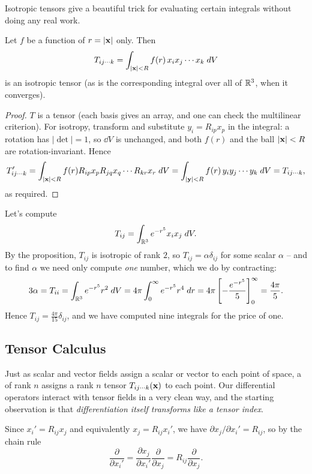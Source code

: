 \documentclass[a4paper]{scrartcl}
\begin{document}
Isotropic tensors give a beautiful trick for evaluating certain integrals without doing any real work.

\begin{proposition}
	Let $f$ be a function of $r = |\mathbf{x}|$ only. Then
	$$
	T_{ij \cdots k} = \int_{|\mathbf{x}| < R} f(r) \, x_i x_j \cdots x_k \; d V
	$$
	is an isotropic tensor (as is the corresponding integral over all of $\mathbb{R}^3$, when it converges).
\end{proposition}
\begin{proof}
	$T$ is a tensor (each basis gives an array, and one can check the multilinear criterion). For isotropy, transform and substitute $y_i = R_{ip}x_p$ in the integral: a rotation has $|\det| = 1$, so $\dd V$ is unchanged, and both $f(r)$ and the ball $|\mathbf{x}| < R$ are rotation-invariant. Hence
	$$
	T'_{ij\cdots k} = \int_{|\mathbf{x}| < R} f(r) R_{ip}x_p R_{jq}x_q \cdots R_{kr}x_r \; d V = \int_{|\mathbf{y}| < R} f(r) \, y_i y_j \cdots y_k \; d V = T_{ij \cdots k},
	$$
	as required.
\end{proof}

\begin{example}
	Let's compute
	$$
	T_{ij} = \int_{\mathbb{R}^3} e^{-r^5} x_i x_j \; d V.
	$$
	By the proposition, $T_{ij}$ is isotropic of rank $2$, so $T_{ij} = \alpha \delta_{ij}$ for some scalar $\alpha$ -- and to find $\alpha$ we need only compute \emph{one} number, which we do by contracting:
	$$
	3 \alpha = T_{ii} = \int_{\mathbb{R}^3} e^{-r^5} r^2 \; d V = 4\pi \int_0^\infty e^{-r^5} r^4 \; d r = 4 \pi \left[-\frac{e^{-r^5}}{5}\right]_0^\infty = \frac{4\pi}{5}.
	$$
	Hence $T_{ij} = \frac{4 \pi}{15}\delta_{ij}$, and we have computed nine integrals for the price of one.
\end{example}

\subsection{Tensor Calculus}

Just as scalar and vector fields assign a scalar or vector to each point of space, a  of rank $n$ assigns a rank $n$ tensor $T_{ij\cdots k}(\mathbf{x})$ to each point. Our differential operators interact with tensor fields in a very clean way, and the starting observation is that \emph{differentiation itself transforms like a tensor index}.

Since $x_i' = R_{ij}x_j$ and equivalently $x_j = R_{ij}x_i'$, we have $\partial x_j / \partial x_i' = R_{ij}$, so by the chain rule
$$
\frac{\partial}{\partial x_i'} = \frac{\partial x_j}{\partial x_i'} \frac{\partial}{\partial x_j} = R_{ij} \frac{\partial}{\partial x_j}.
$$
\end{document}
